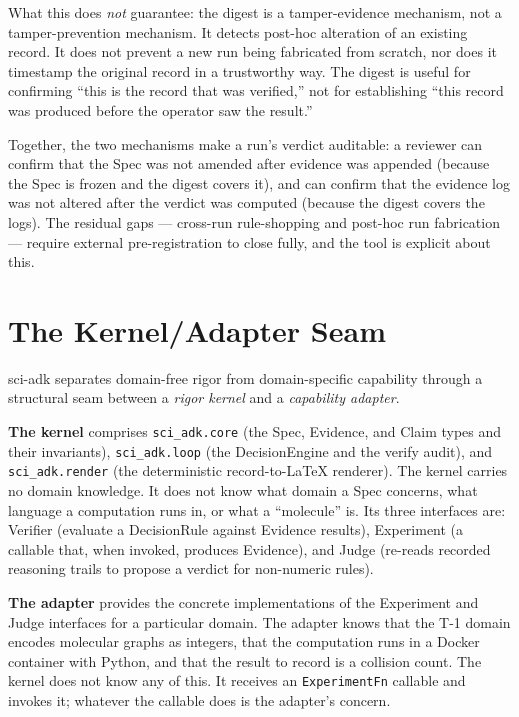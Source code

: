 \documentclass[11pt]{article}
\begin{document}
What this does \textit{not} guarantee: the digest is a tamper-evidence mechanism, not a tamper-prevention mechanism. It detects post-hoc alteration of an existing record. It does not prevent a new run being fabricated from scratch, nor does it timestamp the original record in a trustworthy way. The digest is useful for confirming ``this is the record that was verified,'' not for establishing ``this record was produced before the operator saw the result.''

Together, the two mechanisms make a run's verdict auditable: a reviewer can confirm that the Spec was not amended after evidence was appended (because the Spec is frozen and the digest covers it), and can confirm that the evidence log was not altered after the verdict was computed (because the digest covers the logs). The residual gaps --- cross-run rule-shopping and post-hoc run fabrication --- require external pre-registration to close fully, and the tool is explicit about this.

\section{The Kernel/Adapter Seam}

sci-adk separates domain-free rigor from domain-specific capability through a structural seam between a \textit{rigor kernel} and a \textit{capability adapter}.

\textbf{The kernel} comprises \texttt{sci\_adk.core} (the Spec, Evidence, and Claim types and their invariants), \texttt{sci\_adk.loop} (the DecisionEngine and the verify audit), and \texttt{sci\_adk.render} (the deterministic record-to-LaTeX renderer). The kernel carries no domain knowledge. It does not know what domain a Spec concerns, what language a computation runs in, or what a ``molecule'' is. Its three interfaces are: Verifier (evaluate a DecisionRule against Evidence results), Experiment (a callable that, when invoked, produces Evidence), and Judge (re-reads recorded reasoning trails to propose a verdict for non-numeric rules).

\textbf{The adapter} provides the concrete implementations of the Experiment and Judge interfaces for a particular domain. The adapter knows that the T-1 domain encodes molecular graphs as integers, that the computation runs in a Docker container with Python, and that the result to record is a collision count. The kernel does not know any of this. It receives an \texttt{ExperimentFn} callable and invokes it; whatever the callable does is the adapter's concern.
\end{document}
